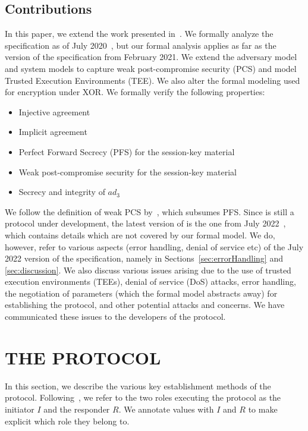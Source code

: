 \documentclass[runningheads]{llncs}
\newcommand{\mConstStyle}[1]{\textsf{#1}}
\newcommand{\mProtocolStyle}[1]{\text{#1}}
\newcommand{\mSpec}{specification}  %
\newcommand{\mTamarin}{\mProtocolStyle{Tamarin}}
\newcommand{\mEdhoc}{\mProtocolStyle{EDHOC}}
\newcommand{\mXor}{\mConstStyle{XOR}}
\newcommand{\mADthree}{\ensuremath{\mathit{ad}_3}}
\begin{document}
\subsection{Contributions}
\label{sec:contributions}
In this paper, we extend the work presented in~\cite{Norr21}.
%
We formally analyze the \mEdhoc{} specification as of July
2020~\cite{our-analysis-selander-lake-edhoc-00}, but our formal analysis applies as far as the version of the \mSpec{} from February 2021.
%
We extend the adversary model and \mTamarin{} system models to capture weak
post-compromise security (PCS) and model Trusted Execution Environments
(TEE).
%
We also alter the formal modeling used for encryption under \mXor{}.
%
We formally verify the following properties:
\begin{itemize}
\item Injective agreement
\item Implicit agreement
\item Perfect Forward Secrecy (PFS) for the session-key material
\item Weak post-compromise security for the session-key material
\item Secrecy and integrity of \mADthree
\end{itemize}
%
We follow the definition of weak PCS by~\cite{DBLP:conf/csfw/Cohn-GordonCG16},
which subsumes PFS.
%
Since \mEdhoc{} is still a protocol under development, the latest version of \mEdhoc{} is the one from July 2022~\cite{draft-ietf-lake-edhoc-15}, which contains details which are not covered by our formal model.
%
We do, however, refer to various aspects
(error handling, denial of service etc) of the July 2022 version of the \mSpec{}, namely 
in Sections~\ref{sec:errorHandling} and \ref{sec:discussion}.
%
We also discuss various issues arising due to the use of trusted
execution environments (TEEs), denial of service (DoS) attacks, error handling,
the negotiation of parameters (which the formal model abstracts
away) for establishing the protocol, and other potential attacks and concerns.
%
We have communicated these issues to the developers of the protocol.
%

\section{\uppercase{The \mEdhoc{} Protocol}}
\label{sec:edhoc}
In this section, we describe the various key establishment methods of the
\mEdhoc{} protocol.
%
Following~\cite{Norr21}, we refer to the two roles executing the protocol as
the initiator $I$ and the responder $R$.
%
We annotate values with $I$ and $R$ to make explicit which role they belong
to.
%
\end{document}
